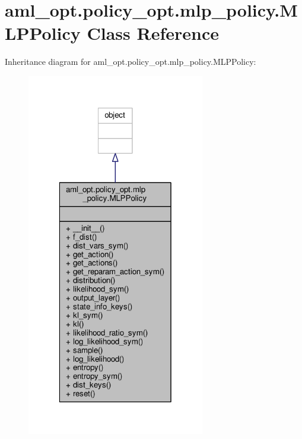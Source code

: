 \hypertarget{classaml__opt_1_1policy__opt_1_1mlp__policy_1_1_m_l_p_policy}{\section{aml\-\_\-opt.\-policy\-\_\-opt.\-mlp\-\_\-policy.\-M\-L\-P\-Policy Class Reference}
\label{classaml__opt_1_1policy__opt_1_1mlp__policy_1_1_m_l_p_policy}
}


Inheritance diagram for aml\-\_\-opt.\-policy\-\_\-opt.\-mlp\-\_\-policy.\-M\-L\-P\-Policy\-:
\nopagebreak
\begin{figure}[H]
\begin{center}
\leavevmode
\includegraphics[width=220pt]{classaml__opt_1_1policy__opt_1_1mlp__policy_1_1_m_l_p_policy__inherit__graph}
\end{center}
\end{figure}


